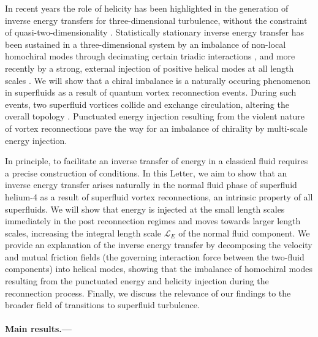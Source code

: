 \documentclass[%
 reprint,
 amsmath,amssymb,
 aps,
 prl,
]{revtex4-2}
\begin{document}
In recent years the role of helicity has been highlighted in the generation of inverse energy transfers for three-dimensional turbulence, without the constraint of quasi-two-dimensionality \cite{chen2003,biferaleInverseEnergyCascade2012a}. Statistically stationary inverse energy transfer has been sustained in a three-dimensional system by an imbalance of non-local homochiral modes through decimating certain triadic interactions \cite{biferaleInverseEnergyCascade2012a}, and more recently by a strong, external injection of positive helical modes at all length scales \cite{plunianInverseCascadeEnergy2020a}. We will show that a chiral imbalance is a naturally occuring phenomenon in superfluids as a result of quantum vortex reconnection events.  During such events, two superfluid vortices collide and exchange circulation, altering the overall topology \cite{villois2020irreversible,zuccher2012quantum}. Punctuated energy injection resulting from the violent nature of vortex reconnections \cite{stasiak2024quantum} pave the way for an imbalance of chirality by multi-scale energy injection. 

In principle, to facilitate an inverse transfer of energy in a classical fluid requires a precise construction of conditions. In this Letter, we aim to show that an inverse energy transfer arises naturally in the normal fluid phase of superfluid helium-4 as a result of superfluid vortex reconnections, an intrinsic property of all superfluids. We will show that energy is injected at the small length scales immediately in the post reconnection regimes and moves towards larger length scales, increasing the integral length scale $\mathcal{L}_E$ of the normal fluid component. We provide an explanation of the inverse energy transfer by decomposing the velocity and mutual friction fields (the governing interaction force between the two-fluid components) into helical modes, showing that the imbalance of homochiral modes resulting from the punctuated energy and helicity injection during the reconnection process. Finally, we discuss the relevance of our findings to the broader field of transitions to superfluid turbulence. 



\paragraph*{Main results.---} 
\end{document}
